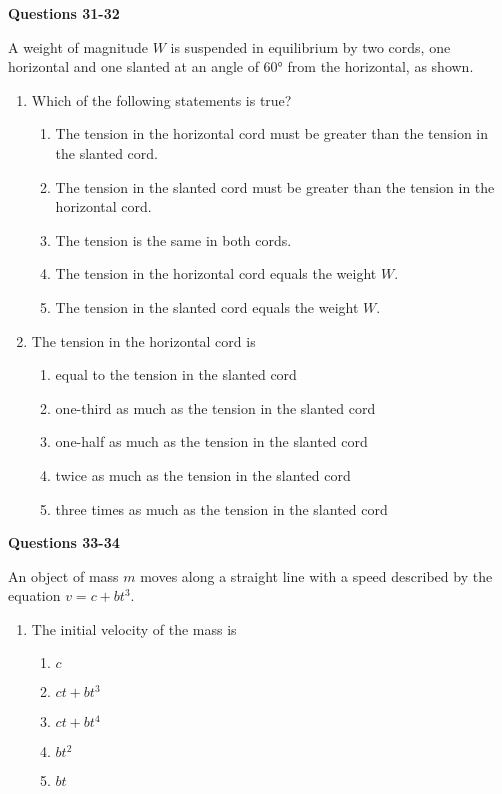 \documentclass{../../oss-apphys}
\begin{document}
\begin{multicols}{2}
  \textbf{Questions 31-32}

  A weight of magnitude $W$ is suspended in equilibrium by two cords, one
  horizontal and one slanted at an angle of \ang{60} from the horizontal, as
  shown.
  \begin{center}
  \end{center}
  \begin{enumerate}[resume,leftmargin=18pt]
  \item Which of the following statements is true?
    \begin{enumerate}[noitemsep,topsep=0pt,leftmargin=18pt,label=(\Alph*)]
    \item The tension in the horizontal cord must be greater than the tension
      in the slanted cord.
    \item The tension in the slanted cord must be greater than the tension in
      the horizontal cord.
    \item The tension is the same in both cords.
    \item The tension in the horizontal cord equals the weight $W$.
    \item The tension in the slanted cord equals the weight $W$.
    \end{enumerate}

  \item The tension in the horizontal cord is
    \begin{enumerate}[noitemsep,topsep=0pt,leftmargin=18pt,label=(\Alph*)]
    \item equal to the tension in the slanted cord
    \item one-third as much as the tension in the slanted cord
    \item one-half as much as the tension in the slanted cord
    \item twice as much as the tension in the slanted cord
    \item three times as much as the tension in the slanted cord
    \end{enumerate}
  \end{enumerate}
  \columnbreak
  
  \textbf{Questions 33-34}

  An object of mass $m$ moves along a straight line with a speed described by
  the equation $v=c+bt^3$.
  \begin{enumerate}[resume,leftmargin=18pt]
  \item The initial velocity of the mass is
    \begin{enumerate}[noitemsep,topsep=0pt,leftmargin=18pt,label=(\Alph*)]
    \item $c$
    \item $ct+bt^3$
    \item $ct+bt^4$
    \item $bt^2$
    \item $bt$
    \end{enumerate}


\end{enumerate}
\end{multicols}
\end{document}
